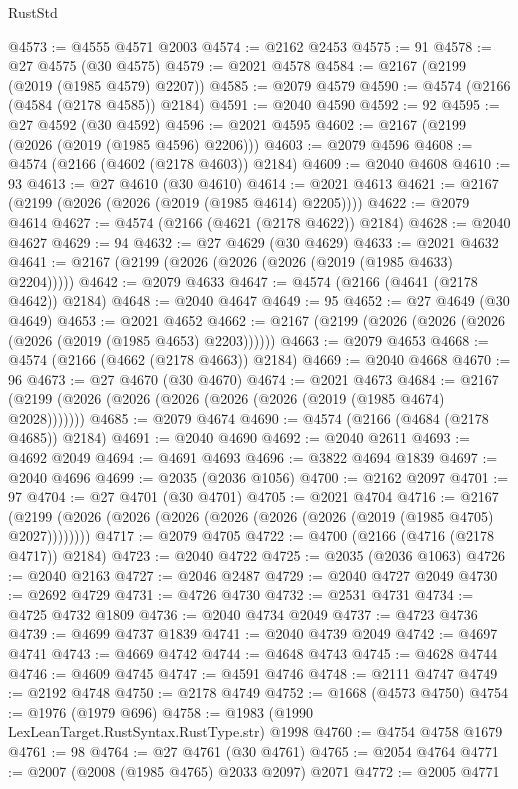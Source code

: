 \begin{lexlean}{RustStd}
\begin{coremodule}
@4573 := @4555 @4571 @2003
@4574 := @2162 @2453
@4575 := 91
@4578 := @27 @4575 (@30 @4575)
@4579 := @2021 @4578
@4584 := @2167 (@2199 (@2019 (@1985 @4579) @2207))
@4585 := @2079 @4579
@4590 := @4574 (@2166 (@4584 (@2178 @4585)) @2184)
@4591 := @2040 @4590
@4592 := 92
@4595 := @27 @4592 (@30 @4592)
@4596 := @2021 @4595
@4602 := @2167 (@2199 (@2026 (@2019 (@1985 @4596) @2206)))
@4603 := @2079 @4596
@4608 := @4574 (@2166 (@4602 (@2178 @4603)) @2184)
@4609 := @2040 @4608
@4610 := 93
@4613 := @27 @4610 (@30 @4610)
@4614 := @2021 @4613
@4621 := @2167 (@2199 (@2026 (@2026 (@2019 (@1985 @4614) @2205))))
@4622 := @2079 @4614
@4627 := @4574 (@2166 (@4621 (@2178 @4622)) @2184)
@4628 := @2040 @4627
@4629 := 94
@4632 := @27 @4629 (@30 @4629)
@4633 := @2021 @4632
@4641 := @2167 (@2199 (@2026 (@2026 (@2026 (@2019 (@1985 @4633) @2204)))))
@4642 := @2079 @4633
@4647 := @4574 (@2166 (@4641 (@2178 @4642)) @2184)
@4648 := @2040 @4647
@4649 := 95
@4652 := @27 @4649 (@30 @4649)
@4653 := @2021 @4652
@4662 := @2167 (@2199 (@2026 (@2026 (@2026 (@2026 (@2019 (@1985 @4653) @2203))))))
@4663 := @2079 @4653
@4668 := @4574 (@2166 (@4662 (@2178 @4663)) @2184)
@4669 := @2040 @4668
@4670 := 96
@4673 := @27 @4670 (@30 @4670)
@4674 := @2021 @4673
@4684 := @2167 (@2199 (@2026 (@2026 (@2026 (@2026 (@2026 (@2019 (@1985 @4674) @2028)))))))
@4685 := @2079 @4674
@4690 := @4574 (@2166 (@4684 (@2178 @4685)) @2184)
@4691 := @2040 @4690
@4692 := @2040 @2611
@4693 := @4692 @2049
@4694 := @4691 @4693
@4696 := @3822 @4694 @1839
@4697 := @2040 @4696
@4699 := @2035 (@2036 @1056)
@4700 := @2162 @2097
@4701 := 97
@4704 := @27 @4701 (@30 @4701)
@4705 := @2021 @4704
@4716 := @2167 (@2199 (@2026 (@2026 (@2026 (@2026 (@2026 (@2026 (@2019 (@1985 @4705) @2027))))))))
@4717 := @2079 @4705
@4722 := @4700 (@2166 (@4716 (@2178 @4717)) @2184)
@4723 := @2040 @4722
@4725 := @2035 (@2036 @1063)
@4726 := @2040 @2163
@4727 := @2046 @2487
@4729 := @2040 @4727 @2049
@4730 := @2692 @4729
@4731 := @4726 @4730
@4732 := @2531 @4731
@4734 := @4725 @4732 @1809
@4736 := @2040 @4734 @2049
@4737 := @4723 @4736
@4739 := @4699 @4737 @1839
@4741 := @2040 @4739 @2049
@4742 := @4697 @4741
@4743 := @4669 @4742
@4744 := @4648 @4743
@4745 := @4628 @4744
@4746 := @4609 @4745
@4747 := @4591 @4746
@4748 := @2111 @4747
@4749 := @2192 @4748
@4750 := @2178 @4749
@4752 := @1668 (@4573 @4750)
@4754 := @1976 (@1979 @696)
@4758 := @1983 (@1990 LexLeanTarget.RustSyntax.RustType.str) @1998
@4760 := @4754 @4758 @1679
@4761 := 98
@4764 := @27 @4761 (@30 @4761)
@4765 := @2054 @4764
@4771 := @2007 (@2008 (@1985 @4765) @2033 @2097) @2071
@4772 := @2005 @4771

\end{coremodule}
\end{lexlean}
